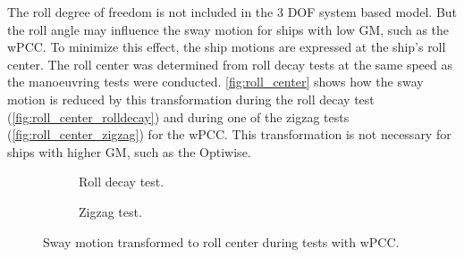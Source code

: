 The roll degree of freedom is not included in the 3 DOF system based model. But the roll angle may influence the sway motion for ships with low GM, such as the wPCC. To minimize this effect, the ship motions are expressed at the ship's roll center. The roll center was determined from roll decay tests at the same speed as the manoeuvring tests were conducted. \autoref{fig:roll_center} shows how the sway motion is reduced by this transformation during the roll decay test (\autoref{fig:roll_center_rolldecay}) and during one of the zigzag tests (\autoref{fig:roll_center_zigzag}) for the wPCC. This transformation is not necessary for ships with higher GM, such as the Optiwise.
\begin{figure}[h]
     \centering
     \begin{subfigure}[b]{0.49\textwidth}
         \centering
         
        \caption{Roll decay test.}
        \label{fig:roll_center_rolldecay}
     \end{subfigure}
     \hfill
     \begin{subfigure}[b]{0.49\textwidth}
        \centering
        
        \caption{Zigzag test.}
        \label{fig:roll_center_zigzag}
     \end{subfigure}
        \caption{Sway motion transformed to roll center during tests with wPCC.}
        \label{fig:roll_center}
\end{figure}